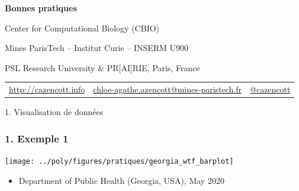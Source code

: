 \documentclass[sans,14pt]{beamer}
\author{Chlo\'e-Agathe~Azencott}
\date{\small Juin 2021}
\newcommand{\mytitle}{Bonnes pratiques}
\begin{document}
{
  \begin{frame}[plain]
    \selectfont
    \begin{center}
      {}
    \end{center}

    \vspace{100pt}

      {\Large \bf \mytitle}

      \insertauthor

      {\footnotesize
        \centerline{Center for Computational Biology (CBIO)}
      
        \centerline{Mines ParisTech -- Institut Curie -- INSERM U900}

        \centerline{PSL Research University \& PR[AI]RIE, Paris, France}
      }

      \centerline {\insertdate}


      \vspace{-15pt}

      \begin{center}
        \begin{tabular}[b]{ccc}
          {\scriptsize \href{http://cazencott.info}{http://cazencott.info}} &
          {\scriptsize \href{chloe-agathe.azencott@mines-paristech.fr}
            {chloe-agathe.azencott@mines-paristech.fr}} & 
          {\scriptsize \href{http://twitter.com/cazencott}{@cazencott}} \\
        \end{tabular}
      \end{center}
\end{frame}

\addtocounter{framenumber}{-1}

\begin{frame}
  \begin{center}
    \Large 1. Visualisation de données
  \end{center}
\end{frame}

\begin{frame}
  \frametitle{1. Exemple 1}
  \begin{center}
    \texttt{[image: ../poly/figures/pratiques/georgia\_wtf\_barplot]}
  \end{center}
  \begin{itemize}
  \item[] \footnotesize{Department of Public Health (Georgia, USA), May 2020}
  \end{itemize}
\end{frame}

}
\end{document}
